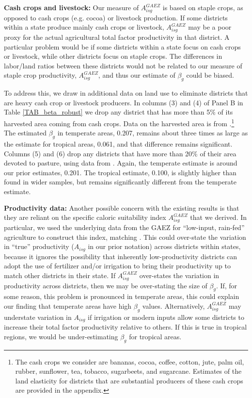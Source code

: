 \documentclass[11pt]{article}
\begin{document}
\vspace{.5cm}\noindent\textbf{Cash crops and livestock:} Our measure of $A_{isg}^{GAEZ}$ is based on staple crops, as opposed to cash crops (e.g. cocoa) or livestock production. If some districts within a state produce mainly cash crops or livestock, $A_{isg}^{GAEZ}$ may be a poor proxy for the actual agricultural total factor productivity in that district. A particular problem would be if some districts within a state focus on cash crops or livestock, while other districts focus on staple crops. The differences in labor/land ratios between these districts would not be related to our measure of staple crop productivity, $A_{isg}^{GAEZ}$, and thus our estimate of $\beta_g$ could be biased. 

To address this, we draw in additional data on land use to eliminate districts that are heavy cash crop or livestock producers. In columns (3) and (4) of Panel B in Table \ref{TAB_beta_robust} we drop any district that has more than 5\% of its harvested area coming from cash crops. Data on the harvested area is from \cite{mrf2008}.\footnote{The cash crops we consider are bananas, cocoa, coffee, cotton, jute, palm oil, rubber, sunflower, tea, tobacco, sugarbeets, and sugarcane. Estimates of the land elasticity for districts that are substantial producers of these cash crops are provided in the appendix.} The estimated $\beta_g$ in temperate areas, 0.207, remains about three times as large as the estimate for tropical areas, 0.061, and that difference remains significant. Columns (5) and (6) drop any districts that have more than 20\% of their area devoted to pasture, using data from \cite{remf2008}. Again, the temperate estimate is around our prior estimates, 0.201. The tropical estimate, 0.100, is slightly higher than found in wider samples, but remains significantly different from the temperate estimate.

\vspace{.5cm}\noindent\textbf{Productivity data:} Another possible concern with the existing results is that they are reliant on the specific caloric suitability index $A_{isg}^{GAEZ}$ that we derived. In particular, we used the underlying data from the GAEZ for ``low-input, rain-fed'' agriculture to construct this index, matching \cite{galorozak2016}. This could over-state the variation in ``true'' productivity ($A_{isg}$ in our prior notation) across districts within states, because it ignores the possibility that inherently low-productivity districts can adopt the use of fertilizer and/or irrigation to bring their productivity up to match other districts in their state. If $A_{isg}^{GAEZ}$ over-states the variation in productivity across districts, then we may be over-stating the size of $\beta_g$. If, for some reason, this problem is pronounced in temperate areas, this could explain our finding that temperate areas have high $\beta_g$ values. Alternatively, $A_{isg}^{GAEZ}$ may understate variation in $A_{isg}$ if irrigation or modern inputs allow some districts to increase their total factor productivity relative to others. If this is true in tropical regions, we would be under-estimating $\beta_g$ for tropical areas.
\end{document}
